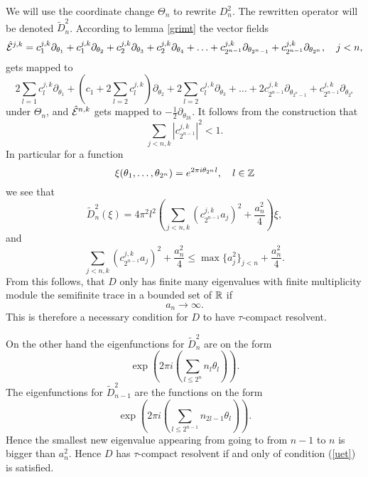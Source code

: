 \documentclass[12pt]{article}
\def\ce{{\cal E}}
\newcommand{\bbR}{{\Bbb R}}
\newcommand{\bbZ}{{\Bbb Z}}
\begin{document}
{We will use the coordinate change $\Theta_n$ to rewrite $D_n^2$. The rewritten operator will be denoted $\tilde{D}_n^2$. According to lemma \ref{grimt} the vector fields
$$\hat{\ce}^{j,k}=c_1^{j,k}\partial_{\theta_1}+c_1^{j,k}\partial_{\theta_2} +c_2^{j,k}\partial_{\theta_3}+c_2^{j,k}\partial_{\theta_4}+\ldots +c_{2^{n-1}}^{j,k}\partial_{\theta_{2^n-1}}+c_{2^{n-1}}^{j,k}\partial_{\theta_{2^n}}, \quad j < n,$$
gets mapped to
$$ 2\sum_{l=1}c_l^{j,k}\partial_{\theta_1}+(c_1+2\sum_{l=2}c_l^{j,k})\partial_{\theta_2} + 2\sum_{l=2}c_l^{j,k}\partial_{\theta_3}+ \ldots + 2c_{2^{n-1}}^{j,k}\partial_{\theta_{2^n-1}}+ c_{2^{n-1}}^{j,k}\partial_{\theta_{2^n}} $$
under $\Theta_n$, and $\hat{\ce}^{n,k}$ gets mapped to  
$-\frac{1}{2 } \partial_{\theta_{2k}}$.
It follows from the construction that 
$$\sum_{j<n,k}|c_{2^{n-1}}^{j,k}|^2<1.$$
In particular for a function 
$$\xi (\theta_1,\ldots ,\theta_{2^n})=e^{2\pi i \theta_{2^n}l}, \quad l\in \bbZ$$
we see that 
$$\tilde{D}_n^2(\xi)=4 \pi^2l^2( \sum_{j< n,k}(c_{2^{n-1}}^{j,k} a_j)^2 +\frac{a_n^2}{4}) \xi,$$
and 
$$ \sum_{j < n,k}(c_{2^{n-1}}^{j,k}a_j)^2 +\frac{a_n^2}{4}\leq \max \{a_j^2\}_{j<n}+\frac{a_n^2}{4}.$$
From this follows, that $D$ only has finite many eigenvalues with finite multiplicity module  the semifinite trace in a bounded set of $\bbR$ if 
\begin{equation} \label{uet}
 a_n\to \infty.
\end{equation}
This is therefore a necessary condition for $D$ to have $\tau$-compact resolvent.

On the other hand the eigenfunctions for $\tilde{D}_n^2$ are on the form 
$$\exp (2\pi i (\sum_{l\leq 2^n} n_l \theta_l)).$$
The eigenfunctions for  $\tilde{D}_{n-1}^2$ are the functions on the form  
$$\exp (2\pi i (\sum_{l\leq 2^{n-1}} n_{2l-1} \theta_l)).$$
Hence the smallest new eigenvalue appearing from going to from $n-1$ to $n$ is bigger than $a_n^2$. Hence $D$ has $\tau$-compact resolvent if and only of condition (\ref{uet}) is satisfied. 

}
\end{document}
